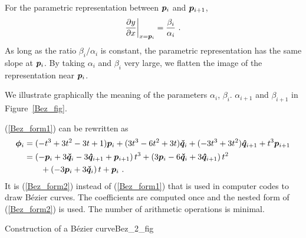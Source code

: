 For the parametric representation between $\bm{p}_i$ and $\bm{p}_{i+1}$,
\[
\frac{\partial{y}}{\partial{x}}\bigg|_{x=\bm{p}_i} = \frac{\beta_i}{\alpha_i}\ .
\]
As long as the ratio $\beta_i/\alpha_i$ is
constant, the parametric representation has the same slope at
$\bm{p}_i$.  By taking $\alpha_i$ and $\beta_i$ very large, we
flatten the image of the representation near $\bm{p}_i$.

We illustrate graphically the meaning
of the parameters $\alpha_i$, $\beta_i$. $\alpha_{i+1}$ and
$\beta_{i+1}$ in Figure~\ref{Bez_fig}.


(\ref{Bez_form1}) can be rewritten as
\begin{align}
\bm{\phi}_i &= (-t^3+3t^2-3t+1) \bm{p}_i + (3t^3-6t^2+3t) \bm{\check{q}}_i +
(-3t^3+3t^2) \bm{\hat{q}}_{i+1} + t^3 \bm{p}_{i+1} \nonumber \\
&= \left(-\bm{p}_i +3\bm{\check{q}}_i - 3 \bm{\hat{q}}_{i+1} +
\bm{p}_{i+1}\right) t^3 + \left(3 \bm{p}_i -6 \bm{\check{q}}_i
 + 3 \bm{\hat{q}}_{i+1}\right) t^2 \nonumber \\
&\qquad + \left(-3 \bm{p}_i + 3  \bm{\check{q}}_i\right) t + \bm{p}_i \ .
\label{Bez_form2}
\end{align}
It is (\ref{Bez_form2}) instead of (\ref{Bez_form1}) that is used in
computer codes to draw Bézier curves.  The coefficients are computed
once and the nested form of (\ref{Bez_form2}) is used.  The number of
arithmetic operations is minimal.

{Construction of a Bézier curve}{Bez_2_fig}

